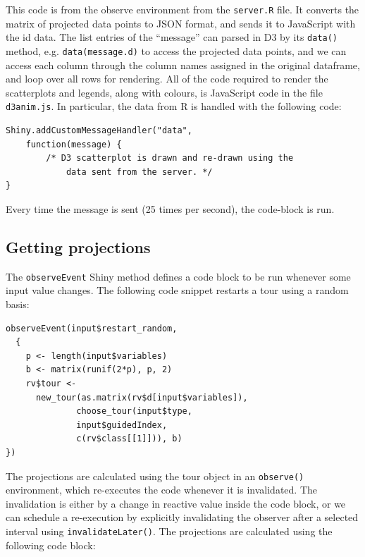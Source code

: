 This code is from the observe environment from the \texttt{server.R}
file. It converts the matrix of projected data points to JSON format,
and sends it to JavaScript with the id data. The list entries of the
``message'' can parsed in D3 by its \texttt{data()} method, e.g.
\texttt{data(message.d)} to access the projected data points, and we can
access each column through the column names assigned in the original
dataframe, and loop over all rows for rendering. All of the code
required to render the scatterplots and legends, along with colours, is
JavaScript code in the file \texttt{d3anim.js}. In particular, the data
from R is handled with the following code:

\begin{verbatim}
Shiny.addCustomMessageHandler("data",
    function(message) {
        /* D3 scatterplot is drawn and re-drawn using the
            data sent from the server. */
}
\end{verbatim}

Every time the message is sent (25 times per second), the code-block is
run.

\hypertarget{getting-projections}{%
\subsection{Getting projections}\label{getting-projections}}

The \texttt{observeEvent} Shiny method defines a code block to be run
whenever some input value changes. The following code snippet restarts a
tour using a random basis:

\begin{verbatim}
observeEvent(input$restart_random,
  {
    p <- length(input$variables)
    b <- matrix(runif(2*p), p, 2)
    rv$tour <- 
      new_tour(as.matrix(rv$d[input$variables]),
              choose_tour(input$type, 
              input$guidedIndex,
              c(rv$class[[1]])), b)
})
\end{verbatim}

The projections are calculated using the tour object in an
\texttt{observe()} environment, which re-executes the code whenever it
is invalidated. The invalidation is either by a change in reactive value
inside the code block, or we can schedule a re-execution by explicitly
invalidating the observer after a selected interval using
\texttt{invalidateLater()}. The projections are calculated using the
following code block:

